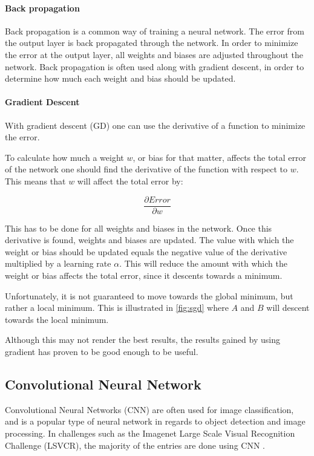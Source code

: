 \paragraph{Back propagation}
Back propagation is a common way of training a neural network.
The error from the output layer is back propagated through the network.
In order to minimize the error at the output layer, all weights and biases are adjusted throughout the network.
Back propagation is often used along with gradient descent, in order to determine how much each weight and bias should be updated.

\paragraph{Gradient Descent}
With gradient descent (GD) one can use the derivative of a function to minimize the error.

To calculate how much a weight $w$, or bias for that matter, affects the total error of the network one should find the derivative of the function with respect to $w$.
This means that $w$ will affect the total error by:

$$\frac{\partial Error}{\partial w}$$

This has to be done for all weights and biases in the network.
Once this derivative is found, weights and biases are updated.
The value with which the weight or bias should be updated equals the negative value of the derivative multiplied by a learning rate $\alpha$.
This will reduce the amount with which the weight or bias affects the total error, since it descents towards a minimum.

Unfortunately, it is not guaranteed to move towards the global minimum, but rather a local minimum.
This is illustrated in \autoref{fig:sgd} where $A$ and $B$ will descent towards the local minimum.


Although this may not render the best results, the results gained by using gradient has proven to be good enough to be useful.

\subsection{Convolutional Neural Network}
\label{sec:cnn}
Convolutional Neural Networks (CNN) are often used for image classification, and is a popular type of neural network in regards to object detection and image processing.
In challenges such as the Imagenet Large Scale Visual Recognition Challenge (LSVCR), the majority of the entries are done using CNN \cite{ILSVRC_Results}. 

